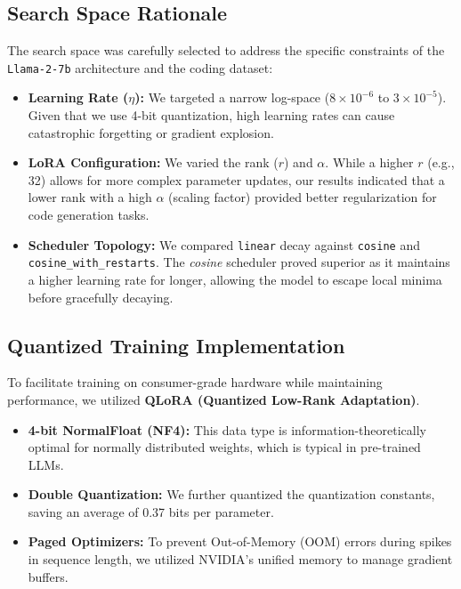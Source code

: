 \subsection{Search Space Rationale}
The search space was carefully selected to address the specific constraints of the \texttt{Llama-2-7b} architecture and the coding dataset:

\begin{itemize}
    \item \textbf{Learning Rate ($\eta$):} We targeted a narrow log-space ($8 \times 10^{-6}$ to $3 \times 10^{-5}$). Given that we use 4-bit quantization, high learning rates can cause catastrophic forgetting or gradient explosion.
    \item \textbf{LoRA Configuration:} We varied the rank ($r$) and $\alpha$. While a higher $r$ (e.g., 32) allows for more complex parameter updates, our results indicated that a lower rank with a high $\alpha$ (scaling factor) provided better regularization for code generation tasks.
    \item \textbf{Scheduler Topology:} We compared \texttt{linear} decay against \texttt{cosine} and \texttt{cosine\_with\_restarts}. The \textit{cosine} scheduler proved superior as it maintains a higher learning rate for longer, allowing the model to escape local minima before gracefully decaying.
\end{itemize}

\subsection{Quantized Training Implementation}
To facilitate training on consumer-grade hardware while maintaining performance, we utilized \textbf{QLoRA (Quantized Low-Rank Adaptation)}. 
\begin{itemize}
    \item \textbf{4-bit NormalFloat (NF4):} This data type is information-theoretically optimal for normally distributed weights, which is typical in pre-trained LLMs.
    \item \textbf{Double Quantization:} We further quantized the quantization constants, saving an average of 0.37 bits per parameter.
    \item \textbf{Paged Optimizers:} To prevent Out-of-Memory (OOM) errors during spikes in sequence length, we utilized NVIDIA's unified memory to manage gradient buffers.
\end{itemize}

